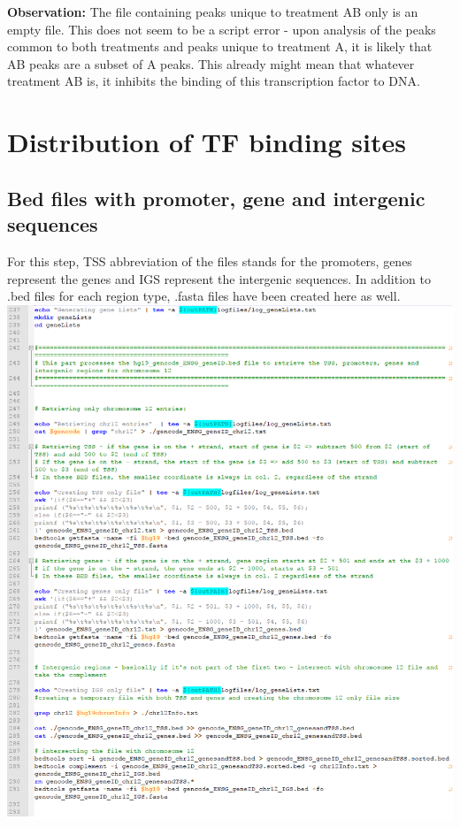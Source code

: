 \documentclass[a4paper,11pt]{article}
\begin{document}
\noindent \textbf{Observation:} The file containing peaks unique to treatment AB only is an empty file. This does not seem to be a script error - upon analysis of the peaks common to both treatments and peaks unique to treatment A, it is likely that AB peaks are a subset of A peaks. This already might mean that whatever treatment AB is, it inhibits the binding of this transcription factor to DNA.

\section{Distribution of TF binding sites}
\subsection{Bed files with promoter, gene and intergenic sequences}
\noindent For this step, TSS abbreviation of the files stands for the promoters, genes represent the genes and IGS represent the intergenic sequences. In addition to .bed files for each region type, .fasta files have been created here as well.\\

\noindent \includegraphics[scale=0.75]{geneLists1.PNG}
\end{document}
